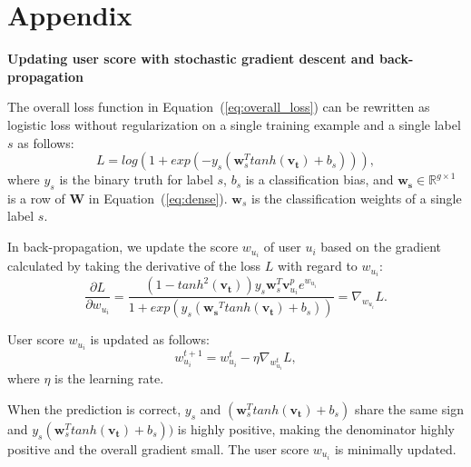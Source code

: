 \documentclass{bmcart}
\begin{document}
\section*{Appendix}
{\bf Updating user score with stochastic gradient descent and back-propagation}

The overall loss function in Equation~(\ref{eq:overall_loss}) can be rewritten as logistic loss without regularization on a single training example and a single label $s$ as follows: 
\begin{equation}
    L = log(1+exp(-y_s(\boldsymbol{w}_{s}^T tanh(\boldsymbol{v_t})+b_s))), 
\end{equation}
where $y_s$ is the binary truth for label $s$, $b_s$ is a classification bias, and $\boldsymbol{w_s}\in \mathbb{R}^{g\times1}$ is a row of $\boldsymbol{W}$ in Equation~(\ref{eq:dense}). $\boldsymbol{w}_{s}$ is the classification weights of a single label $s$.

In back-propagation, we update the score $w_{u_i}$ of user $u_i$ based on the gradient calculated by taking the derivative of the loss $L$ 
with regard to $w_{u_i}$:
\begin{equation}
    \frac{\partial L}{\partial w_{u_i}} = \frac{(1-tanh^2(\boldsymbol{v_t})){y_s}\boldsymbol{w}_{s}^T \boldsymbol{v}^{p}_{u_i}e^{w_{u_i}}}{1+exp(y_s(\boldsymbol{w_s}^T tanh(\boldsymbol{v_t})+b_s))}=\nabla_{w_{u_i}}L.
\end{equation}

User score $w_{u_i}$ is updated as follows: 
\begin{equation}
    w^{t+1}_{u_i} = w^{t}_{u_i} - \eta\nabla_{w^{t}_{u_i}}L,
\end{equation}
where $\eta$ is the learning rate.

When the prediction is correct, $y_s$ and $(\boldsymbol{w}_{s}^T tanh(\boldsymbol{v_t})+b_s)$ share the same sign and $y_s(\boldsymbol{w}_{s}^T tanh(\boldsymbol{v_t})+b_s))$ is highly positive, making the denominator highly positive and the overall gradient small. The user score $w_{u_i}$ is minimally updated.
\end{document}
